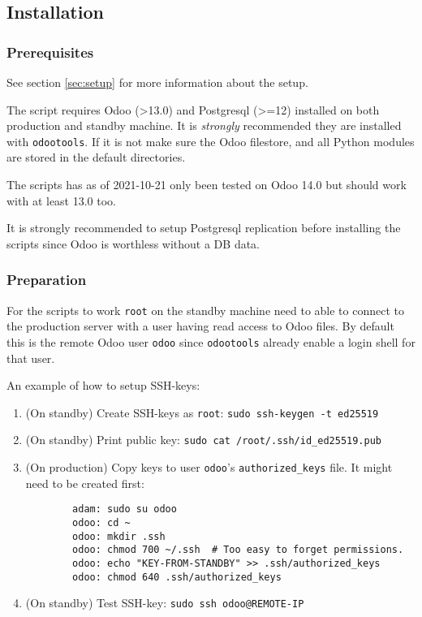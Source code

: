 \documentclass[a4paper]{article}
\begin{document}
\subsection{Installation}
\subsubsection{Prerequisites}

See section \ref{sec:setup} for more information about the setup.

The script requires Odoo (>13.0) and Postgresql (>=12) installed on both production and standby machine. It is \emph{strongly} recommended they are installed with \texttt{odootools}. If it is not make sure the Odoo filestore, and all Python modules are stored in the default directories.

The scripts has as of 2021-10-21 only been tested on Odoo 14.0 but should work with at least 13.0 too.

It is strongly recommended to setup Postgresql replication before installing the scripts since Odoo is worthless without a DB data.

\subsubsection{Preparation}

For the scripts to work \texttt{root} on the standby machine need to able to connect to the production server with a user having read access to Odoo files. By default this is the remote Odoo user \texttt{odoo} since \texttt{odootools} already enable a login shell for that user.

An example of how to setup SSH-keys:
\begin{enumerate}
	\item (On standby) Create SSH-keys as \texttt{root}: \texttt{sudo ssh-keygen -t ed25519}
	\item (On standby) Print public key: \texttt{sudo cat /root/.ssh/id\_ed25519.pub}
	\item (On production) Copy keys to user \texttt{odoo}'s \texttt{authorized\_keys} file. It might need to be created first:
	\begin{verbatim}
		adam: sudo su odoo
		odoo: cd ~
		odoo: mkdir .ssh
		odoo: chmod 700 ~/.ssh  # Too easy to forget permissions.
		odoo: echo "KEY-FROM-STANDBY" >> .ssh/authorized_keys
		odoo: chmod 640 .ssh/authorized_keys
	\end{verbatim}
	\item (On standby) Test SSH-key: \texttt{sudo ssh odoo@REMOTE-IP}
\end{enumerate}
\end{document}
